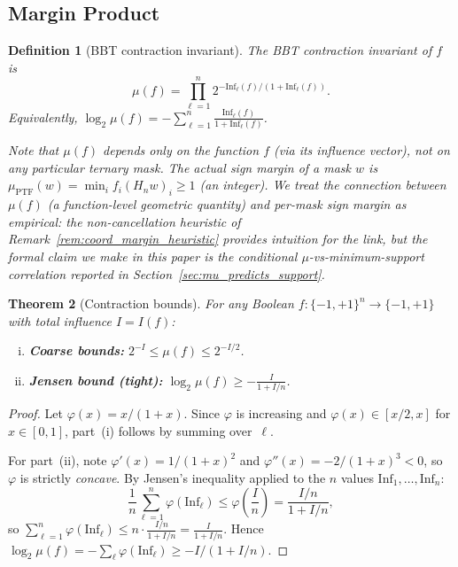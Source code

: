 \documentclass[11pt]{article}
\newtheorem{theorem}{Theorem}[section]
\newtheorem{definition}[theorem]{Definition}
\newcommand{\Inf}{\mathrm{Inf}}
\begin{document}
\subsection{Margin Product}

\begin{definition}[BBT contraction invariant]
\label{def:margin}
The \emph{BBT contraction invariant} of $f$ is
\[
\mu(f) = \prod_{\ell=1}^n 2^{-\Inf_\ell(f)/(1 + \Inf_\ell(f))}.
\]
Equivalently, $\log_2 \mu(f) = -\sum_{\ell=1}^n \frac{\Inf_\ell(f)}{1 + \Inf_\ell(f)}$.

Note that $\mu(f)$ depends only on the function $f$ (via its influence vector), not on any particular ternary mask. The actual \emph{sign margin} of a mask $w$ is $\mu_{\mathrm{PTF}}(w) = \min_i f_i (H_n w)_i \ge 1$ (an integer). We treat the connection between $\mu(f)$ (a function-level geometric quantity) and per-mask sign margin as empirical: the non-cancellation heuristic of Remark~\ref{rem:coord_margin_heuristic} provides intuition for the link, but the formal claim we make in this paper is the conditional $\mu$-vs-minimum-support correlation reported in Section~\ref{sec:mu_predicts_support}.
\end{definition}

\begin{theorem}[Contraction bounds]
\label{thm:margin_bounds}
For any Boolean $f:\{-1,+1\}^n \to \{-1,+1\}$ with total influence $I = I(f)$:
\begin{enumerate}[(i)]
    \item \textbf{Coarse bounds:} $\displaystyle 2^{-I} \le \mu(f) \le 2^{-I/2}$.
    \item \textbf{Jensen bound (tight):} $\displaystyle \log_2 \mu(f) \ge -\frac{I}{1 + I/n}$.
\end{enumerate}
\end{theorem}

\begin{proof}
Let $\varphi(x) = x/(1+x)$. Since $\varphi$ is increasing and $\varphi(x) \in [x/2, x]$ for $x \in [0,1]$, part~(i) follows by summing over~$\ell$.

For part~(ii), note $\varphi'(x) = 1/(1+x)^2$ and $\varphi''(x) = -2/(1+x)^3 < 0$, so $\varphi$ is strictly \emph{concave}. By Jensen's inequality applied to the $n$ values $\Inf_1, \ldots, \Inf_n$:
\[
\frac{1}{n}\sum_{\ell=1}^n \varphi(\Inf_\ell) \le \varphi\!\left(\frac{I}{n}\right) = \frac{I/n}{1 + I/n},
\]
so $\sum_{\ell=1}^n \varphi(\Inf_\ell) \le n \cdot \frac{I/n}{1+I/n} = \frac{I}{1+I/n}$.
Hence $\log_2 \mu(f) = -\sum_\ell \varphi(\Inf_\ell) \ge -I/(1+I/n)$.
\end{proof}
\end{document}
